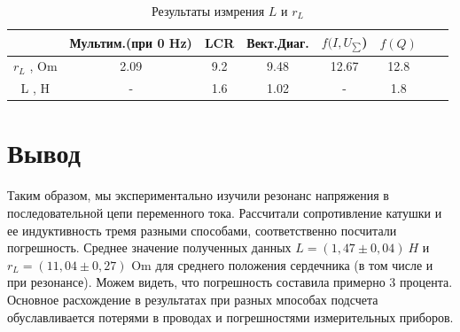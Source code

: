 \documentclass[a4paper, 14pt]{extarticle}%
\begin{document}
\begin{table}[h!]
	\centering
	\caption{ Результаты измрения $ L $ и $ r_{L} $ }
	\begin{tabular}{|c|c|c|c|c|c|c|c|}
		\hline
		  &  Мультим.(при 0 Hz) & LCR & Вект.Диаг. &  $ f( I ,  U_{\sum} $) & $ f( Q )$   \\
		\hline
		$r_{L}$ , Om  & 2.09  & 9.2 & 9.48 & 12.67 & 12.8\\
		\hline
		 L , H & - & 1.6 & 1.02 & - & 1.8 \\
		\hline
	\end{tabular}%
\label{resT}%
\end{table}%


\section{Вывод}
Таким образом, мы экспериментально изучили резонанс напряжения в последовательной цепи переменного тока. Рассчитали сопротивление катушки и ее индуктивность тремя разными способами, соответственно посчитали погрешность.
\newline
Среднее значение полученных данных $ L  = (1,47 \pm0,04) \: H $ и $r_{L} = (11,04 \pm 0,27)$ Om для среднего положения сердечника (в том числе и при резонансе). 
\newline
Можем видеть, что погрешность составила примерно 3 процента. Основное расхождение в результатах при разных мпособах подсчета обуславливается потерями в проводах и погрешностями измерительных приборов.
\end{document}
